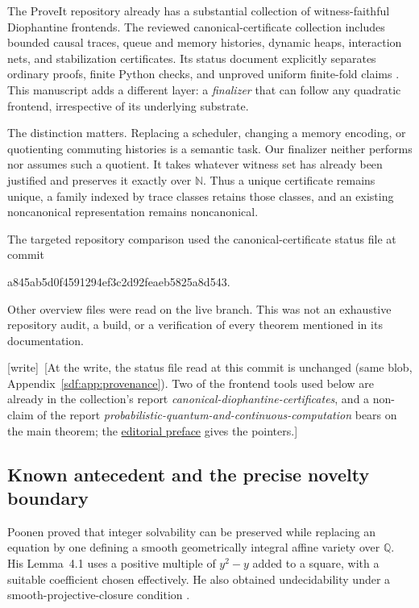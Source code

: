 \documentclass[11pt,a4paper]{article}
\theoremstyle{definition}
\theoremstyle{remark}
\newcommand{\N}{\mathbb N}
\newcommand{\Q}{\mathbb Q}
\newcommand{\wtag}{\textup{[write]}}
\begin{document}
The ProveIt repository already has a substantial collection of witness-faithful
Diophantine frontends. The reviewed canonical-certificate collection includes
bounded causal traces, queue and memory histories, dynamic heaps, interaction
nets, and stabilization certificates. Its status document explicitly separates
ordinary proofs, finite Python checks, and unproved uniform finite-fold claims
\cite{repo,canonical,status}. This manuscript adds a different layer: a
\emph{finalizer} that can follow any quadratic frontend, irrespective of its
underlying substrate.

The distinction matters. Replacing a scheduler, changing a memory encoding,
or quotienting commuting histories is a semantic task. Our finalizer neither
performs nor assumes such a quotient. It takes whatever witness set has already
been justified and preserves it exactly over $\N$. Thus a unique certificate
remains unique, a family indexed by trace classes retains those classes, and
an existing noncanonical representation remains noncanonical.

The targeted repository comparison used the canonical-certificate status file
at commit
\begin{center}\small\ttfamily a845ab5d0f4591294ef3c2d92feaeb5825a8d543.\end{center}
Other overview files were read on the live branch. This was not an exhaustive
repository audit, a build, or a verification of every theorem mentioned in
its documentation.

\wtag\ [At the write, the status file read at this commit is unchanged (same
blob, Appendix~\ref{sdf:app:provenance}). Two of the frontend tools used
below are already in the collection's report
\emph{canonical-diophantine-certificates}, and a non-claim of the report
\emph{probabilistic-quantum-and-continuous-computation} bears on the main
theorem; the \hyperref[sdf:sec:preface]{editorial preface} gives the
pointers.]

\subsection{Known antecedent and the precise novelty boundary}\label{sdf:sec:novelty}

Poonen proved that integer solvability can be preserved while replacing an
equation by one defining a smooth geometrically integral affine variety over
$\Q$. His Lemma~4.1 uses a positive multiple of $y^2-y$ added to a square,
with a suitable coefficient chosen effectively. He also obtained
undecidability under a smooth-projective-closure condition
\cite[Lemma 4.1 and Corollary 4.3]{poonen}.
\end{document}
